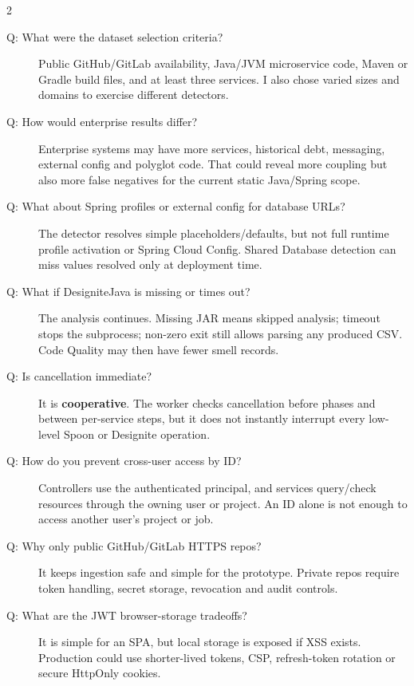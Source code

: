 \documentclass[10pt,a4paper]{article}
\begin{document}
\begin{multicols}{2}
\begin{description}
    \item[Q: What were the dataset selection criteria?]
    Public GitHub/GitLab availability, Java/JVM microservice code, Maven or Gradle build files, and at least three services. I also chose varied sizes and domains to exercise different detectors.

    \item[Q: How would enterprise results differ?]
    Enterprise systems may have more services, historical debt, messaging, external config and polyglot code. That could reveal more coupling but also more false negatives for the current static Java/Spring scope.

    \item[Q: What about Spring profiles or external config for database URLs?]
    The detector resolves simple placeholders/defaults, but not full runtime profile activation or Spring Cloud Config. Shared Database detection can miss values resolved only at deployment time.

    \item[Q: What if DesigniteJava is missing or times out?]
    The analysis continues. Missing JAR means skipped analysis; timeout stops the subprocess; non-zero exit still allows parsing any produced CSV. Code Quality may then have fewer smell records.

    \item[Q: Is cancellation immediate?]
    It is \textbf{cooperative}. The worker checks cancellation before phases and between per-service steps, but it does not instantly interrupt every low-level Spoon or Designite operation.

    \item[Q: How do you prevent cross-user access by ID?]
    Controllers use the authenticated principal, and services query/check resources through the owning user or project. An ID alone is not enough to access another user's project or job.

    \item[Q: Why only public GitHub/GitLab HTTPS repos?]
    It keeps ingestion safe and simple for the prototype. Private repos require token handling, secret storage, revocation and audit controls.

    \item[Q: What are the JWT browser-storage tradeoffs?]
    It is simple for an SPA, but local storage is exposed if XSS exists. Production could use shorter-lived tokens, CSP, refresh-token rotation or secure HttpOnly cookies.


\end{description}
\end{multicols}
\end{document}
